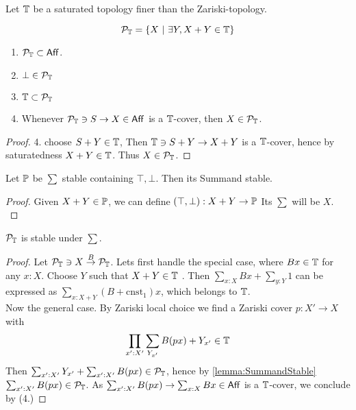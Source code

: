 Let $\mathbb{T}$ be a saturated topology finer than the Zariski-topology.
\begin{definition}
	\[
	\mathcal{P}_{\mathbb{T}}= \{X  \ | \ \exists Y , X + Y \in \mathbb{T}\}
	\]
\end{definition}

\begin{lemma}{\label{lemma:flatBasics}}

\begin{enumerate}
	\
	\item $\mathcal{P}_{\mathbb{T}} \subset \mathsf{Aff}$.
	\item $\bot \in \mathcal{P}_{\mathbb{T}}$
	\item $\mathbb{T} \subset \mathcal{P}_{\mathbb{T}}$
	\item Whenever $\mathcal{P}_{\mathbb{T}} \ni S \to X \in \mathsf{Aff}$ is a $\mathbb{T}$-cover, then $X \in \mathcal{P}_{\mathbb{T}}$. 
\end{enumerate}
\end{lemma}
\begin{proof}
	4. choose $S + Y \in \mathbb{T}$, Then $\mathbb{T} \ni S + Y \to X + Y$ is a $\mathbb{T}$-cover, hence by saturatedness $X + Y \in \mathbb{T}$. Thus $X \in \mathcal{P}_{\mathbb{T}}$.
\end{proof}
\begin{lemma}{\label{lemma:SummandStable}}
	Let $\mathbb{P}$ be $\sum$ stable containing $\top , \bot$. Then its Summand stable.
\end{lemma}
\begin{proof}
	Given $X + Y \in \mathbb{P}$, we can define $(\top, \bot) : X + Y \to \mathbb{P}$ Its $\sum$ will be $X$. \\
\end{proof}



\begin{prop}
	$\mathcal{P}_{\mathbb{T}}$ is stable under $\sum$.
\end{prop}
\begin{proof}
	Let $\mathcal{P}_{\mathbb{T}} \ni X \overset{B}{\to} \mathcal{P}_{\mathbb{T}}$. Lets first handle the special case, where $B x \in \mathbb{T}$ for any $x : X$. Choose $Y$ such that $X + Y \in \mathbb{T}$ . Then $\sum_{x: X} B x + \sum_{y:Y} 1$ can be expressed as $\sum_{x : X + Y} (B + \mathrm{cnst}_1) x$, which belongs to $\mathbb{T}$. \\	 
	Now the general case. By Zariski local choice we find a Zariski cover $p : X' \to X$ with 
	\[
	\prod_{x' : X'} \sum_{Y_{x'}} B (p x) + Y_{x'} \in \mathbb{T}
	\]
	Then $\sum_{x' : X'} Y_{x'} + \sum_{x' : X'} B (p x) \in \mathcal{P}_{\mathbb{T}}$, hence by \ref{lemma:SummandStable} $\sum_{x': X'} B (p x) \in \mathcal{P}_{\mathbb{T}}$. As $\sum_{x': X'} B (p x) \to \sum_{x: X} B x \in \mathsf{Aff}$ is a $\mathbb{T}$-cover, we conclude by (4.)

\end{proof}

